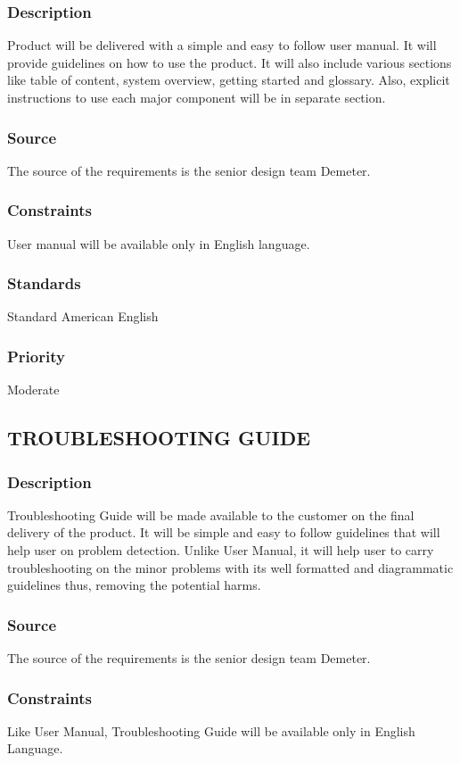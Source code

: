 \subsubsection{Description}
Product will be delivered with a simple and easy to follow user manual. It will provide guidelines on how to use the product. It will also include various sections like table of content, system overview, getting started and glossary. Also, explicit instructions to use each major component will be in separate section. 
\subsubsection{Source}
The source of the requirements is the senior design team Demeter.
\subsubsection{Constraints}
User manual will be available only in English language.
\subsubsection{Standards}
Standard American English
\subsubsection{Priority}
Moderate

\subsection{TROUBLESHOOTING GUIDE}
\subsubsection{Description}
Troubleshooting Guide will be made available to the customer on the final delivery of the product. It will be simple and easy to follow guidelines that will help user on problem detection. Unlike User Manual, it will help user to carry troubleshooting on the minor problems with its well formatted and diagrammatic guidelines thus, removing the potential harms.
\subsubsection{Source}
The source of the requirements is the senior design team Demeter.
\subsubsection{Constraints}
Like User Manual, Troubleshooting Guide will be available only in English Language.
